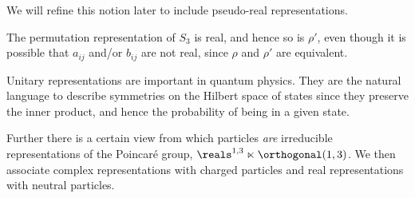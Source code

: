 We will refine this notion later to include pseudo-real representations.

The permutation representation of \(S_3\) is real, and hence so is
\(\rho'\), even though it is possible that \(a_{ij}\) and/or \(b_{ij}\) are not
real, since \(\rho\) and \(\rho'\) are equivalent.

\begin{app}{}{}
    Unitary representations are important in quantum physics.
    They are the natural language to describe symmetries on the Hilbert
    space of states since they preserve the inner product, and hence the probability
    of being in a given state.
    
    Further there is a certain view from which particles \emph{are}
    irreducible representations of the Poincar\'e group, \(\reals^{1, 3} \ltimes
    \orthogonal(1, 3)\).
    We then associate complex representations with charged particles and
    real representations with neutral particles.
\end{app}

